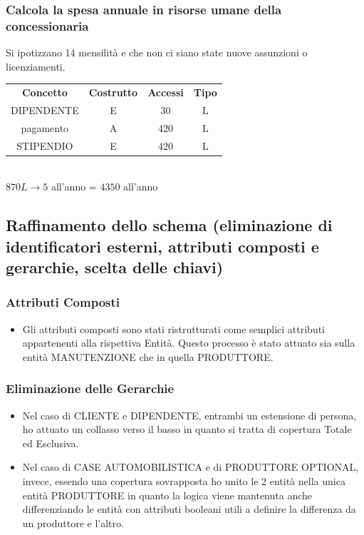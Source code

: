 \documentclass[11pt]{article}
\begin{document}
\subsubsection{Calcola la spesa annuale in risorse umane della concessionaria}

Si ipotizzano 14 mensilità e che non ci siano state nuove assunzioni o licenziamenti.

\begin{table}[H]
    \centering
    \begin{tabular}{c c c c}
        \rowcolor{red!20!}
        \textbf{Concetto} & \textbf{Costrutto} & \textbf{Accessi} &
        \textbf{Tipo}\\
        DIPENDENTE & E & 30 & L \\
        pagamento & A & 420 & L \\
        STIPENDIO & E & 420 & L \\
    \end{tabular}\\
    \( 870L \rightarrow 5 \) all'anno = \( 4350 \) all'anno
\end{table}

\subsection{Raffinamento dello schema (eliminazione di identificatori esterni,
attributi composti e gerarchie, scelta delle chiavi)}

\subsubsection{Attributi Composti}
\begin{itemize}
    \item Gli attributi composti sono stati ristrutturati come semplici
    attributi appartenenti alla rispettiva Entità. Questo processo è stato
    attuato sia sulla entità MANUTENZIONE che in quella PRODUTTORE.
\end{itemize}

\subsubsection{Eliminazione delle Gerarchie}

\begin{itemize}
    \item Nel caso di CLIENTE e DIPENDENTE, entrambi un estensione di persona,
    ho attuato un collasso verso il basso in quanto si tratta di copertura
    Totale ed Esclusiva.
    \item Nel caso di CASE AUTOMOBILISTICA e di PRODUTTORE OPTIONAL, invece,
    essendo una copertura sovrapposta ho unito le 2 entità nella unica entità
    PRODUTTORE in quanto la logica viene mantenuta anche differenziando le
    entità con attributi booleani utili a definire la differenza da un produttore e
    l'altro.
\end{itemize}
\end{document}
